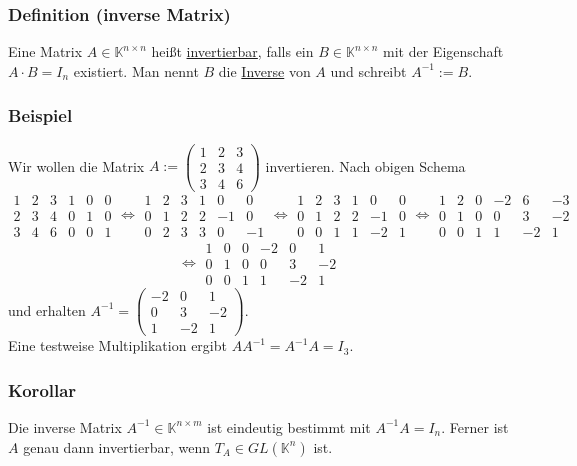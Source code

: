 \subsubsection{Definition (inverse Matrix)}
Eine Matrix $A\in\mathbb{K}^{n\times n}$ heißt \underline{invertierbar}, falls ein $B\in\mathbb{K}^{n\times n}$ mit der Eigenschaft $A\cdot B=I_n$ existiert.  Man nennt $B$ die \underline{Inverse} von $A$ und schreibt $A^{-1}:=B$.
\subsubsection{Beispiel}
Wir wollen die Matrix $A:=\begin{pmatrix}1&2&3\\2&3&4\\3&4&6\end{pmatrix}$ invertieren.  Nach obigen Schema
\[\begin{array}{ccc|ccc}1&2&3&1&0&0\\2&3&4&0&1&0\\3&4&6&0&0&1\end{array}\Leftrightarrow \begin{array}{ccc|ccc}1&2&3&1&0&0\\0&1&2&2&-1&0\\0&2&3&3&0&-1\end{array}\Leftrightarrow \begin{array}{ccc|ccc}1&2&3&1&0&0\\0&1&2&2&-1&0\\0&0&1&1&-2&1\end{array}\Leftrightarrow \begin{array}{ccc|ccc}1&2&0&-2&6&-3\\0&1&0&0&3&-2\\0&0&1&1&-2&1\end{array}\]
\[\Leftrightarrow \begin{array}{ccc|ccc}1&0&0&-2&0&1\\0&1&0&0&3&-2\\0&0&1&1&-2&1\end{array}\]
und erhalten $A^{-1}=\begin{pmatrix}-2&0&1\\0&3&-2\\1&-2&1\end{pmatrix}$.\\
Eine testweise Multiplikation ergibt $AA^{-1}=A^{-1}A=I_3$.
\subsubsection{Korollar}
Die inverse Matrix $A^{-1}\in\mathbb{K}^{n\times m}$ ist eindeutig bestimmt mit $A^{-1}A=I_n$.  Ferner ist $A$ genau dann invertierbar, wenn $T_A\in GL(\mathbb{K}^n)$ ist.
